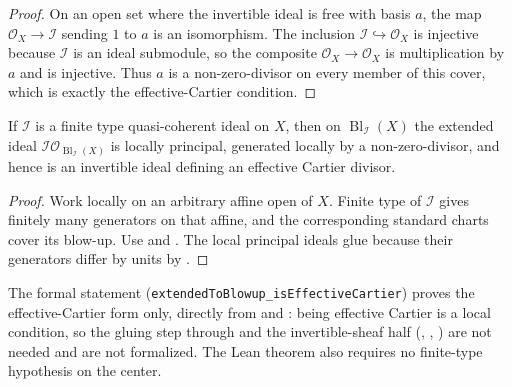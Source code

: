 \begin{proof}
  \leanok
  On an open set where the invertible ideal is free with basis $a$, the map
  $\mathcal O_X\to\mathcal I$ sending $1$ to $a$ is an isomorphism.  The
  inclusion $\mathcal I\hookrightarrow\mathcal O_X$ is injective because
  $\mathcal I$ is an ideal submodule, so the composite
  $\mathcal O_X\to\mathcal O_X$ is multiplication by $a$ and is injective.
  Thus $a$ is a non-zero-divisor on every member of this cover, which is
  exactly the effective-Cartier condition.
\end{proof}

\begin{theorem}
  \label{thm:nagata-blowup-principalizes-center}
  \leanok

  If $\mathcal I$ is a finite type quasi-coherent ideal on $X$, then on
  $\operatorname{Bl}_{\mathcal I}(X)$ the extended ideal
  $\mathcal I\mathcal O_{\operatorname{Bl}_{\mathcal I}(X)}$ is locally
  principal, generated locally by a non-zero-divisor, and hence is an
  invertible ideal defining an effective Cartier divisor.
\end{theorem}

\begin{proof}
  \leanok
  Work locally on an arbitrary affine open of $X$.  Finite type of
  $\mathcal I$ gives finitely many generators on that affine, and the
  corresponding standard charts cover its blow-up.  Use
   and
  .  The local principal ideals
  glue because their generators differ by units by
  .
\end{proof}

\begin{remark}
  The formal statement (\texttt{extendedToBlowup\_isEffectiveCartier}) proves
  the effective-Cartier form only, directly from
   and
  : being effective Cartier is a
  local condition, so the gluing step through
   and the invertible-sheaf
  half (,
  ,
  ) are not needed
  and are not formalized.  The Lean theorem also requires no finite-type
  hypothesis on the center.
\end{remark}

